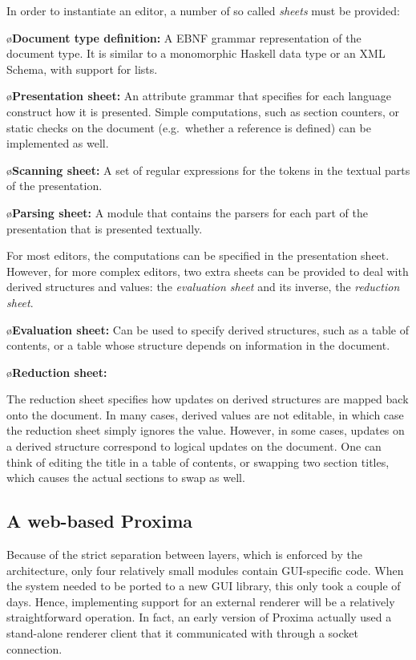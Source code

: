 \documentclass[10pt]{article}
\begin{document}
In order to instantiate an editor, a number of so called {\em sheets} must be provided:

\bl
\o{\bf Document type definition:} 
A EBNF grammar representation of the document type. It is similar to a monomorphic Haskell data type or an XML Schema, with support for lists.

\o{\bf Presentation sheet:} 
An attribute grammar that specifies for each language construct how it is presented. Simple computations, such as section counters, or static checks on the document (e.g.\ whether a reference is defined) can be implemented as well.

\o{\bf Scanning sheet:}
A set of regular expressions for the tokens in the textual parts of the presentation.

\o{\bf Parsing sheet:} 
A module that contains the parsers for each part of the presentation that is presented textually.
\el

For most editors, the computations can be specified in the presentation sheet. However, for more complex editors, two extra sheets can be provided to deal with derived structures and values: the {\em evaluation sheet} and its inverse, the {\em reduction sheet}.  

\bl
\o{\bf Evaluation sheet:}
Can be used to specify derived structures, such as a table of contents, or a table whose structure depends on information in the document. 

\o{\bf Reduction sheet:}

The reduction sheet specifies how updates on derived structures are mapped back onto the document. In many cases, derived values are not editable, in which case the reduction sheet simply ignores the value. However, in some cases, updates on a derived structure correspond to logical updates on the document. One can think of editing the title in a table of contents, or swapping two section titles, which causes the actual sections to swap as well. 
\el


\subsection{A web-based Proxima}


Because of the strict separation between layers, which is enforced by the architecture, 
only four relatively small modules contain GUI-specific code. When the system needed to be ported to a new GUI library, this only took a couple of days. Hence, implementing support for an external renderer will be a relatively straightforward operation. In fact, an early version of Proxima actually used a stand-alone renderer client that it communicated with through a socket connection.
\end{document}
